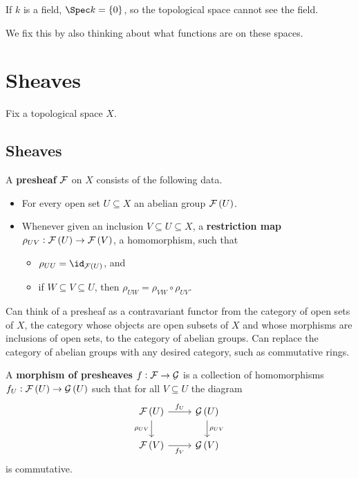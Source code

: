 \begin{example*}
If $ k $ is a field, $ \Spec k = \cbr{0} $, so the topological space cannot see the field.
\end{example*}

We fix this by also thinking about what functions are on these spaces.

\pagebreak

\section{Sheaves}

Fix a topological space $ X $.

\subsection{Sheaves}

\begin{definition*}
A \textbf{presheaf} $ \mathcal{F} $ on $ X $ consists of the following data.
\begin{itemize}
\item For every open set $ U \subseteq X $ an abelian group $ \FFF\br{U} $.
\item Whenever given an inclusion $ V \subseteq U \subseteq X $, a \textbf{restriction map} $ \rho_{UV} : \FFF\br{U} \to \FFF\br{V} $, a homomorphism, such that
\begin{itemize}
\item $ \rho_{UU} = \id_{\FFF\br{U}} $, and
\item if $ W \subseteq V \subseteq U $, then $ \rho_{UW} = \rho_{VW} \circ \rho_{UV} $.
\end{itemize}
\end{itemize}
\end{definition*}

\begin{remark*}
Can think of a presheaf as a contravariant functor from the category of open sets of $ X $, the category whose objects are open subsets of $ X $ and whose morphisms are inclusions of open sets, to the category of abelian groups. Can replace the category of abelian groups with any desired category, such as commutative rings.
\end{remark*}

\begin{definition*}
A \textbf{morphism of presheaves} $ f : \mathcal{F} \to \mathcal{G} $ is a collection of homomorphisms $ f_U : \FFF\br{U} \to \GGG\br{U} $ such that for all $ V \subseteq U $ the diagram
$$
\begin{tikzcd}
\FFF\br{U} \arrow{r}{f_U} \arrow{d}[swap]{\rho_{UV}} & \GGG\br{U} \arrow{d}{\rho_{UV}} \\
\FFF\br{V} \arrow{r}[swap]{f_V} & \GGG\br{V}
\end{tikzcd}
$$
is commutative.
\end{definition*}

